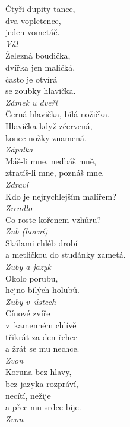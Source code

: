 \begin{multicols}{4}
\noindent
Čtyři dupity tance,\\
dva vopletence,\\
jeden vometáč.\\[1 mm]
{\sl Vůl}\\

\noindent
Železná boudička,\\
dvířka jen maličká,\\
často je otvírá\\
se zoubky hlavička.\\[1 mm]
{\sl Zámek u dveří}\\

\noindent
Černá hlavička, bílá nožička.\\
Hlavička když zčervená,\\
konec nožky znamená.\\[1 mm]
{\sl Zápalka}\\

\noindent
Máš-li mne, nedbáš mně,\\
ztratíš-li mne, poznáš mne.\\[1 mm]
{\sl Zdraví}\\

\noindent
Kdo je nejrychlejším malířem?\\[1 mm]
{\sl Zrcadlo}\\

\noindent
Co roste kořenem vzhůru?\\[1 mm]
{\sl Zub (horní)}\\

\noindent
Skálami chléb drobí\\
a metličkou do studánky zametá.\\[1 mm]
{\sl Zuby a jazyk}\\

\noindent
Okolo porubu,\\
hejno bílých holubů.\\[1 mm]
{\sl Zuby v~ústech}\\

\noindent
Cínové zvíře\\
v~kamenném chlívě\\
třikrát za den řehce\\
a žrát se mu nechce.\\[1 mm]
{\sl Zvon}\\

\noindent
Koruna bez hlavy,\\
bez jazyka rozpráví,\\
necítí, nežije\\
a přec mu srdce bije.\\[1 mm]
{\sl Zvon}\\


\end{multicols}
